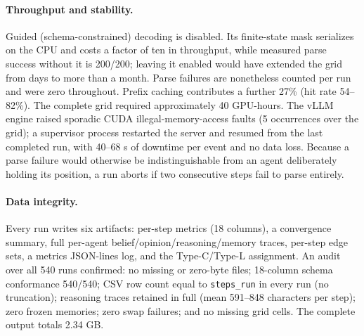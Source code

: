 \paragraph{Throughput and stability.}
Guided (schema-constrained) decoding is disabled. Its finite-state mask serializes on the
CPU and costs a factor of ten in throughput, while measured parse success without it is
200/200; leaving it enabled would have extended the grid from days to more than a month.
Parse failures are nonetheless counted per run and were zero throughout. Prefix caching
contributes a further 27\% (hit rate 54--82\%). The complete grid required approximately
40 GPU-hours. The vLLM engine raised sporadic CUDA illegal-memory-access faults (5
occurrences over the grid); a supervisor process restarted the server and resumed from
the last completed run, with 40--68 s of downtime per event and no data loss. Because a
parse failure would otherwise be indistinguishable from an agent deliberately holding its
position, a run aborts if two consecutive steps fail to parse entirely.

\paragraph{Data integrity.}
Every run writes six artifacts: per-step metrics (18 columns), a convergence summary,
full per-agent belief/opinion/reasoning/memory traces, per-step edge sets, a metrics
JSON-lines log, and the Type-C/Type-L assignment. An audit over all 540 runs confirmed:
no missing or zero-byte files; 18-column schema conformance 540/540; CSV row count equal
to \texttt{steps\_run} in every run (no truncation); reasoning traces retained in full
(mean 591--848 characters per step); zero frozen memories; zero swap failures; and no
missing grid cells. The complete output totals 2.34 GB.

\endgroup
